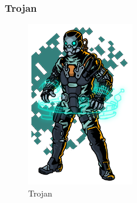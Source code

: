 \documentclass[11pt]{article} %
\begin{document}
\subsubsection{Trojan}

\begin{figure}[!htp]
\centering
\includegraphics[scale=0.5]{res/characters/Trojan.png}
\caption{Trojan}
\label{Trojan}
\end{figure}
\end{document}
